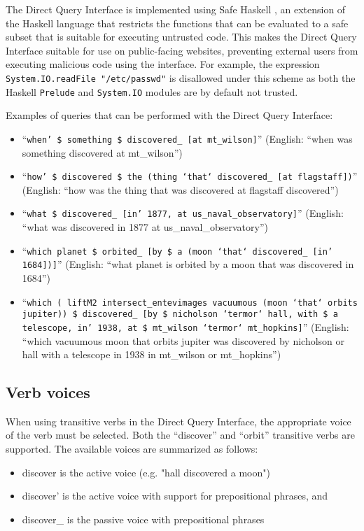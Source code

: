 \documentclass[../main.tex]{subfiles}
\begin{document}
The Direct Query Interface is implemented using Safe Haskell \cite{safehaskell}, an extension of the Haskell language that restricts the functions that can be evaluated
to a safe subset that is suitable for executing untrusted code.  This makes the Direct Query Interface suitable for use on public-facing websites, preventing external users from executing malicious code using the interface.  For example, the expression \texttt{System.IO.readFile "/etc/passwd"} is disallowed under this scheme as both the Haskell \texttt{Prelude} and \texttt{System.IO} modules are by default not trusted.

Examples of queries that can be performed with the Direct Query Interface:
\begin{itemize}
	\item ``\texttt{when' \$ something \$ discovered\_ [at mt\_wilson]}'' (English: ``when was something discovered at mt\_wilson'')
	\item ``\texttt{how' \$ discovered \$ the (thing `that` discovered\_ [at flagstaff])}'' (English: ``how was the thing that was discovered at flagstaff discovered'')
	\item ``\texttt{what \$ discovered\_ [in' 1877, at us\_naval\_observatory]}'' (English: ``what was discovered in 1877 at us\_naval\_observatory'')
	\item ``\texttt{which planet \$ orbited\_ [by \$ a (moon `that` discovered\_ [in' 1684])]}'' (English: ``what planet is orbited by a moon that was discovered in 1684'')
	\item ``\texttt{which ( liftM2 intersect\_entevimages vacuumous  (moon `that` orbits jupiter)) \$ discovered\_ [by \$ nicholson `termor` hall, with \$ a telescope, in' 1938, at \$ mt\_wilson `termor` mt\_hopkins]}'' (English: ``which vacuumous moon that orbits jupiter was discovered by nicholson or hall with a telescope in 1938 in mt\_wilson or mt\_hopkins'')
\end{itemize}

\subsection{Verb voices}

When using transitive verbs in the Direct Query Interface, the appropriate voice of the verb must be selected.  Both the ``discover'' and ``orbit''
transitive verbs are supported.  The available voices are summarized as follows:

\begin{itemize}
	\item discover is the active voice (e.g. "hall discovered a moon")
	\item discover' is the active voice with support for prepositional phrases, and
	\item discover\_ is the passive voice with prepositional phrases
\end{itemize}
\end{document}
